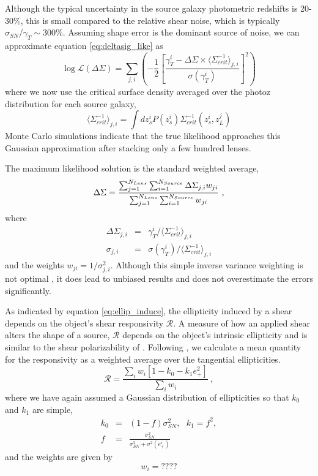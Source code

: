 \documentclass{emulateapj}
\begin{document}
Although the typical uncertainty in the source galaxy 
photometric redshifts is 20-30\%, this
is small compared to the relative shear noise, which is typically 
$\sigma_{SN}/\gamma_T \sim 300$\%.
Assuming shape error is the dominant source of noise, we can approximate equation
\ref{eq:deltasig_like} as
\begin{equation}
\log \mathcal{L}(\Delta\Sigma) = 
\sum_{j,i}
\left(-\frac{1}{2} 
\left[
\frac{\gamma_T^i - \Delta\Sigma \times \langle \Sigma_{crit}^{-1}\rangle_{j,i}}{\sigma(\gamma_T^i)}
\right]^2
\right)
\end{equation}
where we now use the critical surface density averaged over the photoz
distribution for each source galaxy, 
\begin{equation} \label{eq:meansigcrit}
\langle \Sigma_{crit}^{-1} \rangle_{j,i} = \int dz_s^i P(z_s^i) \Sigma_{crit}^{-1}(z_s^i, z_L^j)
\end{equation}
Monte
Carlo simulations indicate that the true likelihood approaches this Gaussian
approximation after stacking only a few hundred lenses.

The maximum likelihood solution is the standard weighted average,
\begin{equation}
\Delta\Sigma =  
{\sum_{j=1}^{N_{Lens}} \sum_{i=1}^{N_{Source}} \Delta\Sigma_{j,i} w_{ji}
\over \sum_{j=1}^{N_{Lens}} \sum_{i=1}^{N_{Source}}w_{ji}} ~,
\end{equation}
where  
\begin{eqnarray}
\Delta\Sigma_{j,i} & = & \gamma_T^i/\langle \Sigma_{crit}^{-1}\rangle_{j,i} \\
\sigma_{j,i} & = & \sigma(\gamma_T^i)/\langle \Sigma_{crit}^{-1}\rangle_{j,i}
\end{eqnarray}
and the weights $w_{ji} = 1/\sigma_{j,i}^2$. 
Although this simple inverse variance weighting
is not optimal \citep{Bern02}, it does lead to unbiased results and 
does not overestimate the errors significantly.


As indicated by equation \ref{eq:ellip_induce}, the ellipticity induced by a shear
depends on the object's shear responsivity $\mathcal{R}$. 
A measure of how an applied shear alters the shape of a source, $\mathcal{R}$ 
depends on the object's intrinsic ellipticity and is similar to
the shear polarizability of \citet{ksb95}. Following \citet{Bern02},  
we calculate a mean
quantity for the responsivity as a 
weighted average over the tangential ellipticities.
\begin{equation}
\mathcal{R} = \frac{ \sum_i w_i \left[ 1 - k_0 - k_1 e_+^2\right] }{\sum_i w_i}~,
\label{eq:responsivity}
\end{equation}
where we have again assumed a Gaussian distribution of ellipticities so 
that $k_0$ and $k_1$ are simple, 
\begin{eqnarray}
k_0 & = & (1-f) \sigma^2_{SN},~~~k_1 = f^2, \nonumber   \\
f & = & \frac{\sigma^2_{SN}}{\sigma^2_{SN} + \sigma^2(e_+^i)}
\end{eqnarray}
and the weights are given by
\begin{equation}
w_i = ????
\end{equation}
\end{document}
